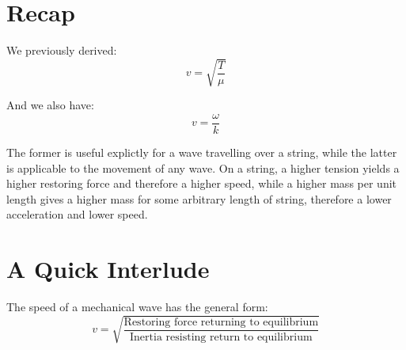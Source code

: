 
\section*{Recap}

We previously derived:
\[
    v = \sqrt{\frac{T}{\mu}}
\]

And we also have:
\[
    v = \frac{\omega}{k}
\]

The former is useful explictly for a wave travelling over a string, while the latter is applicable to the movement of any wave. On a string, a higher tension yields a higher restoring force and therefore a higher speed, while a higher mass per unit length gives a higher mass for some arbitrary length of string, therefore a lower acceleration and lower speed.

\section*{A Quick Interlude}
The speed of a mechanical wave has the general form:
\[
    v = \sqrt{\frac{\text{Restoring force returning to equilibrium}}{\text{Inertia resisting return to equilibrium}}}
\]


